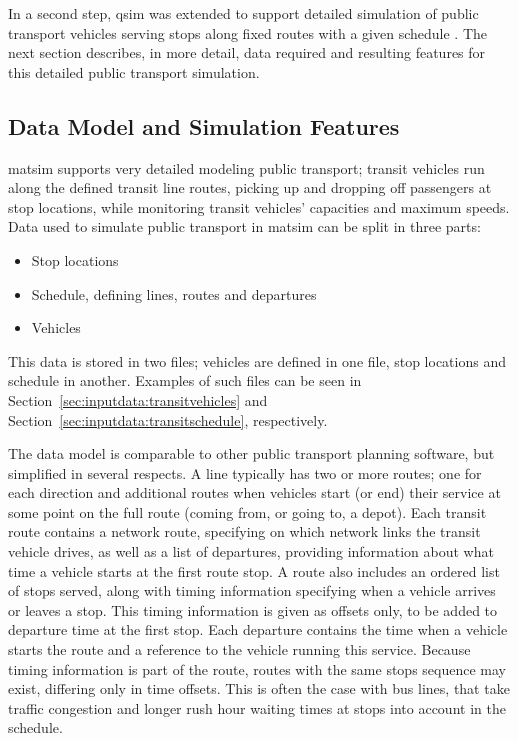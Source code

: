 In a second step, \gls{qsim} was extended to support detailed simulation of
public transport vehicles serving stops along fixed routes with a given schedule
\citep{Rieser2010}.
The next section describes, in more detail, data required and resulting features for this
detailed public transport simulation.

\subsection{Data Model and Simulation Features}
\gls{matsim} supports very detailed modeling public transport; transit
vehicles run along the defined transit line routes, picking up
and dropping off passengers at stop locations, while monitoring transit
vehicles' capacities and maximum speeds. Data used to simulate public
transport in \gls{matsim} can be split in three parts:
%
\begin{itemize}\styleItemize
\item Stop locations
\item Schedule, defining lines, routes and departures
\item Vehicles
\end{itemize}

This data is stored in two files; vehicles are defined in one
file, stop locations and schedule in
another.
Examples of such files can be seen in
Section~\ref{sec:inputdata:transitvehicles} and
Section~\ref{sec:inputdata:transitschedule}, respectively.

The data model is comparable to other public transport planning
software, but simplified in several respects. A line typically has two or more
routes; one for each direction and additional routes when vehicles start
(or end) their service at some point on the full route (coming
from, or going to, a depot). Each transit route contains a network route,
specifying on which network links the transit vehicle drives, as well as
a list of departures, providing information about what time a vehicle
starts at the first route stop. A route also includes an ordered list
of stops served, along with timing information specifying when a vehicle
arrives or leaves a stop. This timing information is given as offsets only, to
be added to departure time at the first stop. Each departure contains the
time when a vehicle starts the route and a reference to the vehicle 
running this service. Because timing information is part of the route, routes
with the same stops sequence may exist, differing only in time offsets.
This is often the case with bus lines, that take traffic congestion and
longer rush hour waiting times at stops into account in the schedule. 

